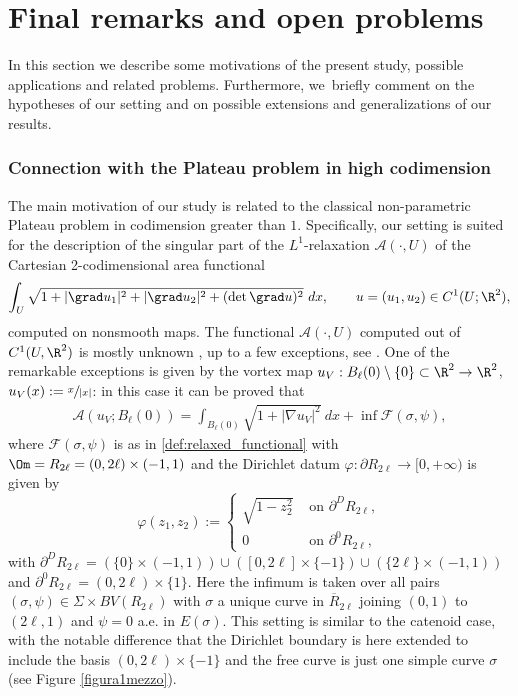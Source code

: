 \section{Final remarks and open problems}
\label{sec:final_comments_and_open_problems}

In this section we describe some motivations of the present study,
possible applications and related problems.
Furthermore, we~briefly comment on the hypotheses of our setting
and on possible extensions and generalizations of our results.

\subsubsection*{Connection with the Plateau problem in high codimension}
The main motivation of our study is related to the classical non-parametric Plateau problem in codimension greater than $1$. Specifically, our setting is suited for the description of the
singular part of the $L^1$-relaxation
$\mathcal A(\cdot, U)$
of the Cartesian 2-codimensional area functional
\begin{equation}
\label{eq:area_smooth_cod_2}
\int_U \sqrt{1 + \vert \grad u_1\vert^2 + \vert \grad u_2\vert^2 +
(\det\grad u)^2} ~dx, \qquad u = (u_1, u_2) \in C^1(U; \R^2),
\end{equation}
computed on nonsmooth maps.
The functional
$\mathcal A(\cdot, U)$
computed
out of $C^1(U, \R^2)$
is mostly unknown \cite{AcDa:94,GiMoSu:98_2}, up to
a few exceptions, see \cite{BePa:10,BeElPaSc:19,Scala:19,vortex}.
One of the remarkable exceptions is given by
the vortex map
$u_V:B_\ell(0) \setminus \{0\}\subset\R^2\to\R^2$,
$u_V(x):=\sfrac{x}{|x|}$:
in this case it can be proved \cite{BES1,BES2,BES3} that
\begin{align}\label{value_vortex}
\mathcal A(u_V; B_\ell(0))
= \int_{B_\ell(0)}\sqrt{1+|\nabla u_V|^2}~dx+\inf\mathcal F(\sigma,\psi),
\end{align}
where $\mathcal F(\sigma,\psi)$ is as in \eqref{def:relaxed_functional} with
$\Om=R_{2\ell}=(0,2\ell)\times(-1,1)$ and the
Dirichlet datum $\varphi :\partial R_{2\ell}\to [0,+\infty)$
is given by
\begin{equation}\label{vortex}
\varphi(z_1,z_2):=\begin{cases}
\sqrt{1-z_2^2}&\text{ on }\partial^DR_{2\ell},\\
0& \text{ on }\partial^0R_{2\ell},
\end{cases}
\end{equation}
with $\partial^DR_{2\ell}=(\{0\}\times (-1,1))\cup ([0,2\ell]\times \{-1\})\cup (\{2\ell\}\times (-1,1))$
and $\partial^0R_{2\ell}=(0,2\ell)\times \{1\}$.
Here the infimum is taken over all pairs $(\sigma,\psi)\in \Sigma\times BV(R_{2\ell})$ with $\sigma$ a unique curve in $\overline R_{2\ell}$ joining $(0,1)$ to $(2\ell,1)$
and $\psi=0$ a.e. in $E(\sigma)$.
This setting is similar to the catenoid case,
with the notable difference that the Dirichlet boundary is here extended to include the basis $(0,2\ell)\times \{-1\}$ and the free curve
is just one simple curve $\sigma$
(see Figure \ref{figura1mezzo}).

